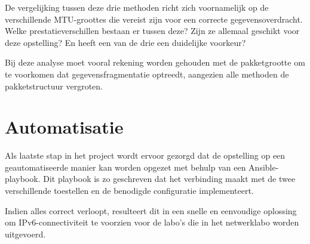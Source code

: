 De vergelijking tussen deze drie methoden richt zich voornamelijk op de verschillende MTU-groottes die vereist zijn voor een correcte gegevensoverdracht.  
Welke prestatieverschillen bestaan er tussen deze? Zijn ze allemaal geschikt voor deze opstelling? En heeft een van de drie een duidelijke voorkeur?  

Bij deze analyse moet vooral rekening worden gehouden met de pakketgrootte om te voorkomen dat gegevensfragmentatie optreedt, aangezien alle methoden de pakketstructuur vergroten.

\section{Automatisatie}
\label{sec:automatisatie}

Als laatste stap in het project wordt ervoor gezorgd dat de opstelling op een geautomatiseerde manier kan worden opgezet met behulp van een Ansible-playbook.  
Dit playbook is zo geschreven dat het verbinding maakt met de twee verschillende toestellen en de benodigde configuratie implementeert.  

Indien alles correct verloopt, resulteert dit in een snelle en eenvoudige oplossing om IPv6-connectiviteit te voorzien voor de labo’s die in het netwerklabo worden uitgevoerd.